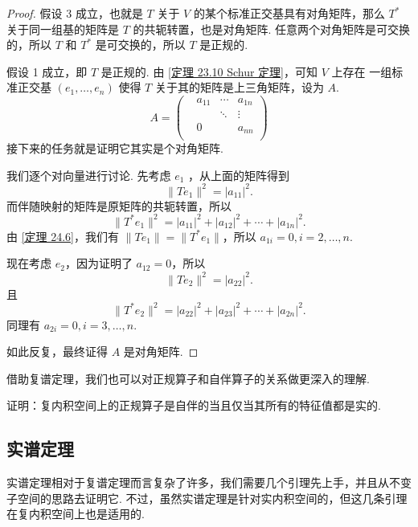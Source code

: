 \begin{proof}
    假设 3 成立，也就是 $ T $ 关于 $ V $ 的某个标准正交基具有对角矩阵，那么 $ T^* $
    关于同一组基的矩阵是 $ T $ 的共轭转置，也是对角矩阵. 任意两个对角矩阵是可交换的，所以
    $ T $ 和 $ T^* $ 是可交换的，所以 $ T $ 是正规的. 

    假设 1 成立，即 $ T $ 是正规的. 由 \ref{定理 23.10 Schur 定理}，可知 $ V $ 上存在
    一组标准正交基 $ (e_1, \ldots , e_n) $ 使得 $ T $ 关于其的矩阵是上三角矩阵，设为 $ A $.  
    \[
        A = 
        \begin{pmatrix}
            & a_{11} & \cdots & a_{1n} \\
            & & \ddots & \vdots\\
            &   0   &         & a_{nn} \\
        \end{pmatrix}
    \]
    接下来的任务就是证明它其实是个对角矩阵.  
    
    我们逐个对向量进行讨论. 先考虑 $ e_1 $ ，从上面的矩阵得到
    \[
        \lVert Te_1 \rVert^2 = \lvert a_{11} \rvert^2.  
    \]
    而伴随映射的矩阵是原矩阵的共轭转置，所以
    \[
        \lVert T^*e_1 \rVert^2 = \lvert a_{11} \rvert^2 + \lvert a_{12} \rvert^2
        + \cdots + \lvert a_{1n} \rvert^2.
    \]
    由 \ref{定理 24.6}，我们有 $ \lVert Te_1 \rVert = \lVert T^*e_1 \rVert $，所以
    $ a_{1i} = 0, i = 2, \ldots , n $.
    
    现在考虑 $ e_2 $，因为证明了 $ a_{12} = 0 $，所以
    \[
        \lVert Te_2 \rVert^2 = \lvert a_{22} \rvert^2.
    \]
    且
    \[
        \lVert T^*e_2 \rVert^2 = \lvert a_{22} \rvert^2 + \lvert a_{23} \rvert^2
        + \cdots + \lvert a_{2n} \rvert^2.
    \]
    同理有 $ a_{2i} = 0, i = 3, \ldots , n $. 

    如此反复，最终证得 $ A $ 是对角矩阵. 
\end{proof}

借助复谱定理，我们也可以对正规算子和自伴算子的关系做更深入的理解. 

\begin{example}
    证明：复内积空间上的正规算子是自伴的当且仅当其所有的特征值都是实的. 
\end{example}

\subsection{实谱定理}

实谱定理相对于复谱定理而言复杂了许多，我们需要几个引理先上手，并且从不变子空间的思路去证明它.
不过，虽然实谱定理是针对实内积空间的，但这几条引理在复内积空间上也是适用的. 

